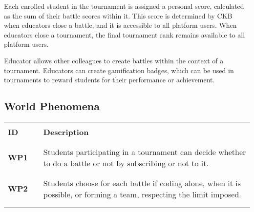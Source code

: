 Each enrolled student in the tournament is assigned a personal score, calculated as the sum of their battle scores within it.
This score is determined by CKB when educators close a battle, and it is accessible to all platform users.
When educators close a tournament, the final tournament rank remains available to all platform users.

Educator allows other colleagues to create battles within the context of a tournament.
Educators can create gamification badges, which can be used in tournaments to reward students for their performance or achievement.

\subsection{World Phenomena}
\renewcommand{\arraystretch}{0.5}
\begin{table}[H]
    \centering
    \begin{tabular}{l l p{12cm}}
        \hline
                     &        &                                                                                                                                                                 \\
        \textbf{ID}  & \vline & \textbf{Description}                                                                                                                                            \\
                     &        &                                                                                                                                                                 \\\hline & & \\
        \textbf{WP1} & \vline & Students participating in a tournament can decide whether to do a battle or not by subscribing or not to it.                                                    \\
                     &        &                                                                                                                                                                 \\\hline & & \\
        \textbf{WP2} & \vline & Students choose for each battle if coding alone, when it is possible, or forming a team, respecting the limit imposed.                                          \\
                     &        &                                                                                                                                                                 \\\hline & & \\

\end{tabular}
\end{table}
